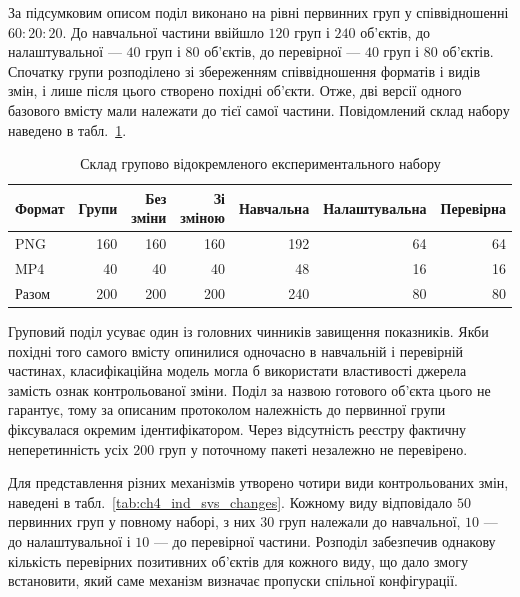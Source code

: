 За підсумковим описом поділ виконано на рівні первинних груп у співвідношенні $60:20:20$. До навчальної частини ввійшло $120$ груп і $240$ об’єктів, до налаштувальної --- $40$ груп і $80$ об’єктів, до перевірної --- $40$ груп і $80$ об’єктів. Спочатку групи розподілено зі збереженням співвідношення форматів і видів змін, і лише після цього створено похідні об’єкти. Отже, дві версії одного базового вмісту мали належати до тієї самої частини. Повідомлений склад набору наведено в табл.~\ref{tab:ch4_ind_svs_dataset}.

\begin{table}[htbp]
\caption{Склад групово відокремленого експериментального набору}
\label{tab:ch4_ind_svs_dataset}
\centering
\small
\begin{tabular}{lrrrrrr}
\toprule
Формат & Групи & Без зміни & Зі зміною & Навчальна & Налаштувальна & Перевірна \\
\midrule
PNG & 160 & 160 & 160 & 192 & 64 & 64 \\
MP4 & 40 & 40 & 40 & 48 & 16 & 16 \\
\midrule
Разом & 200 & 200 & 200 & 240 & 80 & 80 \\
\bottomrule
\end{tabular}
\end{table}

Груповий поділ усуває один із головних чинників завищення показників. Якби похідні того самого вмісту опинилися одночасно в навчальній і перевірній частинах, класифікаційна модель могла б використати властивості джерела замість ознак контрольованої зміни. Поділ за назвою готового об’єкта цього не гарантує, тому за описаним протоколом належність до первинної групи фіксувалася окремим ідентифікатором. Через відсутність реєстру фактичну неперетинність усіх $200$ груп у поточному пакеті незалежно не перевірено.

Для представлення різних механізмів утворено чотири види контрольованих змін, наведені в табл.~\ref{tab:ch4_ind_svs_changes}. Кожному виду відповідало $50$ первинних груп у повному наборі, з них $30$ груп належали до навчальної, $10$ --- до налаштувальної і $10$ --- до перевірної частини. Розподіл забезпечив однакову кількість перевірних позитивних об’єктів для кожного виду, що дало змогу встановити, який саме механізм визначає пропуски спільної конфігурації.


